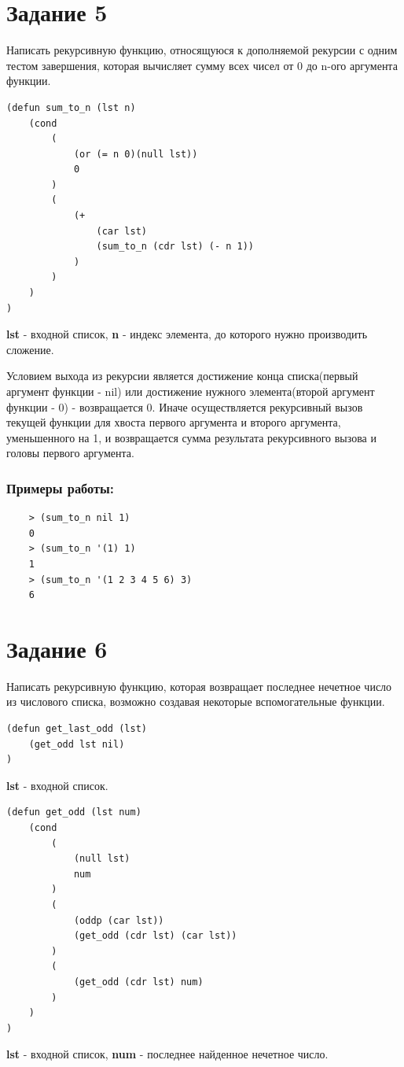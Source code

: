 \documentclass[a4paper, 12pt]{article}
\begin{document}
\section*{Задание 5}
Написать рекурсивную функцию, относящуюся к дополняемой рекурсии с одним тестом завершения, которая вычисляет сумму всех чисел от 0 до n-ого аргумента функции. 
\begin{lstlisting}[caption=Функция вычисления суммы элементов от 0 до n-го]
(defun sum_to_n (lst n)
	(cond
		(
			(or (= n 0)(null lst))
			0
		)
		(
			(+ 
				(car lst)
				(sum_to_n (cdr lst) (- n 1))
			)
		)	
	)
)	
\end{lstlisting}
\textbf{lst} - входной список, \textbf{n} - индекс элемента, до которого нужно производить сложение.

Условием выхода из рекурсии является достижение конца списка(первый аргумент функции - nil) или достижение нужного элемента(второй аргумент функции - 0) - возвращается 0. Иначе осуществляется рекурсивный вызов текущей функции для хвоста первого аргумента и второго аргумента, уменьшенного на 1, и возвращается сумма результата рекурсивного вызова и головы первого аргумента.
\subsubsection*{Примеры работы:}
\begin{lstlisting}
	> (sum_to_n nil 1)
	0
	> (sum_to_n '(1) 1)
	1
	> (sum_to_n '(1 2 3 4 5 6) 3)
	6
\end{lstlisting}

\section*{Задание 6}
Написать рекурсивную функцию, которая возвращает последнее нечетное число из числового списка, возможно создавая некоторые вспомогательные функции.

\begin{lstlisting}[caption=Функция-обертка для получения последнего нечетного числа]
(defun get_last_odd (lst)
	(get_odd lst nil)
)
\end{lstlisting}
\textbf{lst} - входной список.
\begin{lstlisting}[caption=Функция получения последнего нечетного числа]
(defun get_odd (lst num)
	(cond	
		(
			(null lst) 
			num
		)
		(
			(oddp (car lst))
			(get_odd (cdr lst) (car lst))
		)
		(
			(get_odd (cdr lst) num)
		)
	)
)
\end{lstlisting}
\textbf{lst} - входной список, \textbf{num} - последнее найденное нечетное число.
\end{document}
